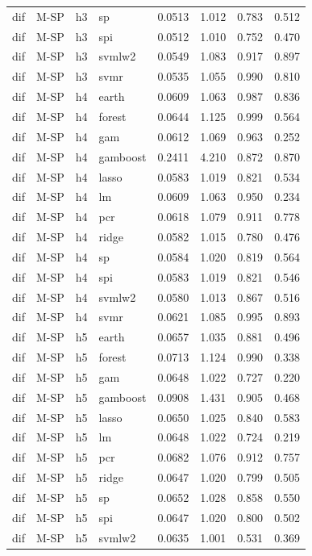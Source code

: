 \begin{ThreePartTable}
\begin{longtable}[t]{llclcccc}
dif & M-SP & h3 & sp & 0.0513 & 1.012 & 0.783 & 0.512\\
dif & M-SP & h3 & spi & 0.0512 & 1.010 & 0.752 & 0.470\\
dif & M-SP & h3 & svmlw2 & 0.0549 & 1.083 & 0.917 & 0.897\\
dif & M-SP & h3 & svmr & 0.0535 & 1.055 & 0.990 & 0.810\\
\addlinespace
dif & M-SP & h4 & earth & 0.0609 & 1.063 & 0.987 & 0.836\\
dif & M-SP & h4 & forest & 0.0644 & 1.125 & 0.999 & 0.564\\
dif & M-SP & h4 & gam & 0.0612 & 1.069 & 0.963 & 0.252\\
dif & M-SP & h4 & gamboost & 0.2411 & 4.210 & 0.872 & 0.870\\
dif & M-SP & h4 & lasso & 0.0583 & 1.019 & 0.821 & 0.534\\
dif & M-SP & h4 & lm & 0.0609 & 1.063 & 0.950 & 0.234\\
dif & M-SP & h4 & pcr & 0.0618 & 1.079 & 0.911 & 0.778\\
dif & M-SP & h4 & ridge & 0.0582 & 1.015 & 0.780 & 0.476\\
dif & M-SP & h4 & sp & 0.0584 & 1.020 & 0.819 & 0.564\\
dif & M-SP & h4 & spi & 0.0583 & 1.019 & 0.821 & 0.546\\
dif & M-SP & h4 & svmlw2 & 0.0580 & 1.013 & 0.867 & 0.516\\
dif & M-SP & h4 & svmr & 0.0621 & 1.085 & 0.995 & 0.893\\
\addlinespace
dif & M-SP & h5 & earth & 0.0657 & 1.035 & 0.881 & 0.496\\
dif & M-SP & h5 & forest & 0.0713 & 1.124 & 0.990 & 0.338\\
dif & M-SP & h5 & gam & 0.0648 & 1.022 & 0.727 & 0.220\\
dif & M-SP & h5 & gamboost & 0.0908 & 1.431 & 0.905 & 0.468\\
dif & M-SP & h5 & lasso & 0.0650 & 1.025 & 0.840 & 0.583\\
dif & M-SP & h5 & lm & 0.0648 & 1.022 & 0.724 & 0.219\\
dif & M-SP & h5 & pcr & 0.0682 & 1.076 & 0.912 & 0.757\\
dif & M-SP & h5 & ridge & 0.0647 & 1.020 & 0.799 & 0.505\\
dif & M-SP & h5 & sp & 0.0652 & 1.028 & 0.858 & 0.550\\
dif & M-SP & h5 & spi & 0.0647 & 1.020 & 0.800 & 0.502\\
dif & M-SP & h5 & svmlw2 & 0.0635 & 1.001 & 0.531 & 0.369\\

\end{longtable}
\end{ThreePartTable}
